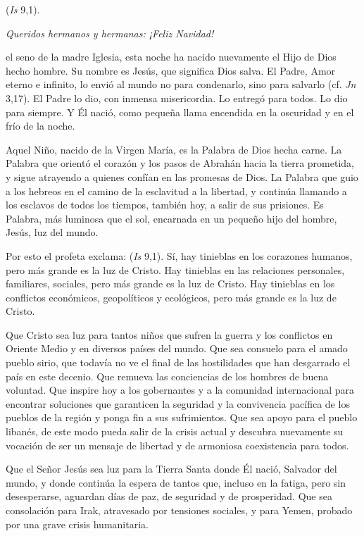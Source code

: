 \begin{body}
	 (\emph{Is} 9,1).
	
	\emph{Queridos hermanos y hermanas: ¡Feliz Navidad!}
	
	 el seno de la madre Iglesia, esta noche ha nacido nuevamente el Hijo de Dios hecho hombre. Su nombre es Jesús, que significa Dios salva. El Padre, Amor eterno e infinito, lo envió al mundo no para condenarlo, sino para salvarlo (cf. \emph{Jn} 3,17). El Padre lo dio, con inmensa misericordia. Lo entregó para todos. Lo dio para siempre. Y Él nació, como pequeña llama encendida en la oscuridad y en el frío de la noche.
	
	Aquel Niño, nacido de la Virgen María, es la Palabra de Dios hecha carne. La Palabra que orientó el corazón y los pasos de Abrahán hacia la tierra prometida, y sigue atrayendo a quienes confían en las promesas de Dios. La Palabra que guio a los hebreos en el camino de la esclavitud a la libertad, y continúa llamando a los esclavos de todos los tiempos, también hoy, a salir de sus prisiones. Es Palabra, más luminosa que el sol, encarnada en un pequeño hijo del hombre, Jesús, luz del mundo.
	
	Por esto el profeta exclama:  (\emph{Is} 9,1). Sí, hay tinieblas en los corazones humanos, pero más grande es la luz de Cristo. Hay tinieblas en las relaciones personales, familiares, sociales, pero más grande es la luz de Cristo. Hay tinieblas en los conflictos económicos, geopolíticos y ecológicos, pero más grande es la luz de Cristo.
	
	Que Cristo sea luz para tantos niños que sufren la guerra y los conflictos en Oriente Medio y en diversos países del mundo. Que sea consuelo para el amado pueblo sirio, que todavía no ve el final de las hostilidades que han desgarrado el país en este decenio. Que remueva las conciencias de los hombres de buena voluntad. Que inspire hoy a los gobernantes y a la comunidad internacional para encontrar soluciones que garanticen la seguridad y la convivencia pacífica de los pueblos de la región y ponga fin a sus sufrimientos. Que sea apoyo para el pueblo libanés, de este modo pueda salir de la crisis actual y descubra nuevamente su vocación de ser un mensaje de libertad y de armoniosa coexistencia para todos.
	
	Que el Señor Jesús sea luz para la Tierra Santa donde Él nació, Salvador del mundo, y donde continúa la espera de tantos que, incluso en la fatiga, pero sin desesperarse, aguardan días de paz, de seguridad y de prosperidad. Que sea consolación para Irak, atravesado por tensiones sociales, y para Yemen, probado por una grave crisis humanitaria.
	

\end{body}
